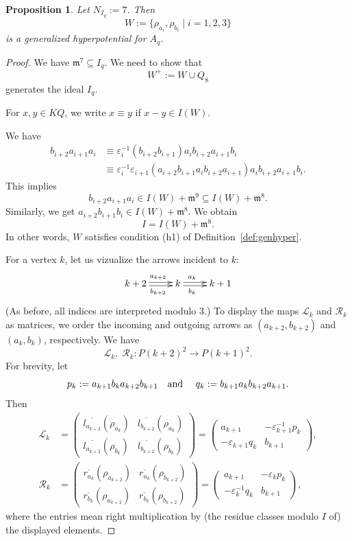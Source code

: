 \documentclass[12pt,reqno]{amsart}
\newtheorem{Prop}[Thm]{Proposition}
\theoremstyle{definition}
\newcommand{\df}{\colon}
\newcommand{\scL}{{\mathscr L}}
\newcommand{\scR}{{\mathscr R}}
\newcommand{\m}{\mathfrak{m}}
\newcommand{\ov}{\overline}
\begin{document}
\begin{Prop}
Let $N_{I_q} := 7$.
Then  
$$
W := \{ \rho_{a_i}, \rho_{b_i} \mid i=1,2,3 \}
$$
is a generalized hyperpotential for $A_q$.
\end{Prop}

\begin{proof}
We have $\m^7 \subseteq I_q$.
We need to show that
$$
W^+ := W \cup Q_8
$$
generates the ideal $I_q$.

For $x,y \in KQ$, we write $x \equiv y$ if $x-y \in I(W)$.

We have
\begin{align*}
b_{i+2}a_{i+1}a_i &\equiv
\varepsilon_i^{-1} (b_{i+2}b_{i+1})a_ib_{i+2}a_{i+1}b_i
\\
&\equiv
\varepsilon_i^{-1}\varepsilon_{i+1}
(a_{i+2}b_{i+1}a_ib_{i+2}a_{i+1})a_ib_{i+2}a_{i+1}b_i.
\end{align*}
This implies 
$$
b_{i+2}a_{i+1}a_i \in I(W) + \m^9 \subseteq I(W) + \m^8.
$$
Similarly, we get $a_{i+2}b_{i+1}b_i 
\in I(W) + \m^8$.
We obtain
$$
I = I(W) + \m^8.
$$
In other words,
$W$ satisfies condition (h1) of Definition~\ref{def:genhyper}.


For a vertex $k$, let us vizualize the arrows incident to $k$:
$$
\xymatrix{
k+2 \ar@<0.4ex>[r]^<<<<{a_{k+2}} 
\ar@<-0.4ex>[r]_<<<<{b_{k+2}}
& k \ar@<0.4ex>[r]^<<<<{a_k}
\ar@<-0.4ex>[r]_<<<<{b_k} & k+1 
}
$$
(As before, all indices are interpreted modulo $3$.)
To display the maps $\scL_k$ and $\scR_k$ as matrices, we order the incoming and outgoing arrows as $(a_{k+2},b_{k+2})$ and 
$(a_k,b_k)$, respectively.
We have
$$
\scL_k,\; \scR_k\df P(k+2)^2 \to P(k+1)^2.
$$
For brevity, let
$$
p_k := a_{k+1}b_ka_{k+2}b_{k+1}
\text{\quad and \quad}
q_k := b_{k+1}a_kb_{k+2}a_{k+1}.
$$
Then
\begin{align*}
\scL_k &= 
\left(\begin{matrix}
\ov{l_{a_{k+2}}}(\rho_{a_k}) & \ov{l_{b_{k+2}}}(\rho_{a_k})
\\
\ov{l_{a_{k+2}}}(\rho_{b_k}) & \ov{l_{b_{k+2}}}(\rho_{b_k})
\end{matrix}\right)
=
\left(\begin{matrix}
a_{k+1} & -\varepsilon_{k+1}^{-1} p_k
\\
-\varepsilon_{k+1}q_k & b_{k+1} 
\end{matrix}\right),
\\
\scR_k &= 
\left(\begin{matrix}
\ov{r_{a_k}}(\rho_{a_{k+2}}) & \ov{r_{a_k}}(\rho_{b_{k+2}})
\\
\ov{r_{b_k}}(\rho_{a_{k+2}}) & \ov{r_{b_k}}(\rho_{b_{k+2}})
\end{matrix}\right)
=
\left(\begin{matrix}
a_{k+1} & -\varepsilon_k p_k
\\
-\varepsilon_k^{-1}q_k & b_{k+1} 
\end{matrix}\right),
\end{align*}
where the entries mean right multiplication by (the residue classes modulo $I$ of) the displayed elements.



\end{proof}
\end{document}
